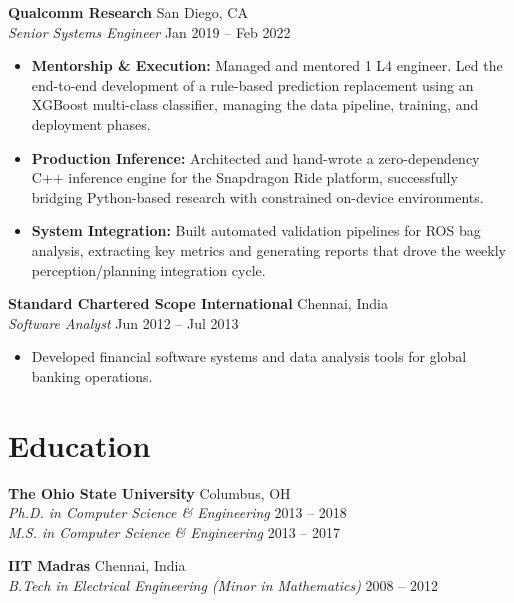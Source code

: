 \documentclass[10pt,letterpaper]{article}
\begin{document}
\textbf{Qualcomm Research} \hfill San Diego, CA \\
\textit{Senior Systems Engineer} \hfill Jan 2019 -- Feb 2022
\begin{itemize}
    \item \textbf{Mentorship \& Execution:} Managed and mentored 1 L4 engineer. Led the end-to-end development of a rule-based prediction replacement using an XGBoost multi-class classifier, managing the data pipeline, training, and deployment phases.
    \item \textbf{Production Inference:} Architected and hand-wrote a zero-dependency C++ inference engine for the Snapdragon Ride platform, successfully bridging Python-based research with constrained on-device environments.
    \item \textbf{System Integration:} Built automated validation pipelines for ROS bag analysis, extracting key metrics and generating reports that drove the weekly perception/planning integration cycle.
\end{itemize}

\textbf{Standard Chartered Scope International} \hfill Chennai, India \\
\textit{Software Analyst} \hfill Jun 2012 -- Jul 2013
\begin{itemize}
    \item Developed financial software systems and data analysis tools for global banking operations.
\end{itemize}

\section{Education}
\textbf{The Ohio State University} \hfill Columbus, OH \\
\textit{Ph.D. in Computer Science \& Engineering} \hfill 2013 -- 2018 \\
\textit{M.S. in Computer Science \& Engineering} \hfill 2013 -- 2017

\textbf{IIT Madras} \hfill Chennai, India \\
\textit{B.Tech in Electrical Engineering (Minor in Mathematics)} \hfill 2008 -- 2012

\end{document}
